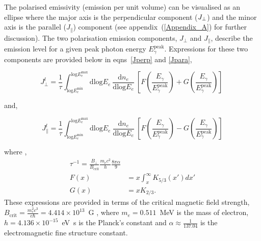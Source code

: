\documentclass[usenatbib]{mnras}
\newcommand{\Andrew}[1]{\textcolor{dg}{#1}}
\begin{document}
The polarised emissivity (emission per unit volume) can be visualised as an ellipse where the major axis is the perpendicular component ($J_{\rm \perp}$) and the minor axis is the parallel ($J_{\parallel}$) component (see appendix~(\ref{Appendix_A}) for further discussion). 
The two polarisation emission components, $J_{\perp}$ and $J_{\parallel}$, describe the emission level for a  given peak photon energy $E_{\gamma}^{\mathrm{peak}}$. Expressions for these two components are provided below in eqns~\ref{Jperp} and \ref{Jpara},

\begin{equation}
 {J_{\perp}^l} = \frac{1}{\tau}  \int_{\mathrm{log}E_e^{\mathrm{min}}}^{\mathrm{log}E_e^{\mathrm{max}}}\mathrm{dlog}E_{e} \  \frac{\mathrm{d}n_e}{\mathrm{dlog}E_{e}} \  \left[F\left(\frac{E_{\gamma}}{E_{\gamma}^{\mathrm{peak}}}\right) + G\left(\frac{E_{\gamma}}{E_{\gamma}^{\mathrm{peak}}}\right)\right] \
 \label{Jperp}
\end{equation}

and,

\begin{equation}
{J_{\parallel}^l} = \frac{1}{\tau} \int_{\mathrm{log}E_e^{\mathrm{min}}}^{\mathrm{log}E_e^{\mathrm{max}}}\mathrm{dlog}E_{e} \ \frac{\mathrm{d}n_e}{\mathrm{dlog}E_{e}} \  \left[F\left(\frac{E_{\gamma}}{E_{\gamma}^{\mathrm{peak}}}\right) - G\left(\frac{E_{\gamma}}{E_{\gamma}^{\mathrm{peak}}}\right)\right] 
\label{Jpara}
\end{equation}

where ,
\begin{align}
\tau^{-1} = \frac{B_{\perp}}{B_{\mathrm{crit}}}\frac{m_{e}c^{2}}{h} \frac{8\pi \alpha}{9}
\\
F(x) &= x \int_x^\infty K_{5/3}(x') dx'\\
G(x) &= x K_{2/3}.
\end{align}
These expressions are provided in terms of the critical magnetic field strength, $B_{\mathrm{crit}} = \frac{m_e^2c^3}{e\hbar} = 4.414 \times 10^{13}$~G , where $m_e = 0.511$~MeV is the mass of electron, $h = 4.136 \times 10^{-15}$~eV~s is the Planck's constant and $\alpha \approx \frac{1}{137.04}$ is the electromagnetic fine structure constant.
\end{document}
